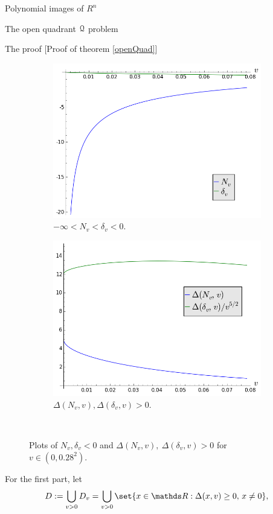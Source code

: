 \documentclass[11pt, a4paper, english, twoside, notitlepage, openright]{report}
\begin{document}
\begin{chapter}{Polynomial images of $R^n$}
\begin{section}{The open quadrant $\mathcal{Q}$ problem}
\begin{subsection}{The proof} [Proof of theorem \ref{openQuad}]
\begin{figure}[h]
\begin{subfigure}{.56\linewidth}
\includegraphics[width=1\textwidth]{plots/ch1_13_comp.png}
\caption{$-\infty<N_v<\delta_v<0$.\label{fig:comp}}
\end{subfigure}
\begin{subfigure}{.6\linewidth}\centering
\includegraphics[width=1\textwidth]{plots/ch1_14_positive.png}
\caption{$\Delta(N_{v}, v), \Delta(\delta_{v},v) > 0$.\label{fig:positive}}
\end{subfigure}\\[1ex]
\caption{Plots of $N_v,\delta_v<0$ and $\Delta(N_{v},v),\ \Delta(\delta_{v},v)>0$ for $v\in(0, 0.28^2)$.\label{fig:N_delta}}
\end{figure} For the first part, let 
$$
D:=\bigcup_{v>0}D_v=\bigcup_{v>0}\set{x\in\R:\Delta(x,v)\geq 0,\,x\neq 0},
$$
\end{subsection}
\end{section}
\end{chapter}
\end{document}
